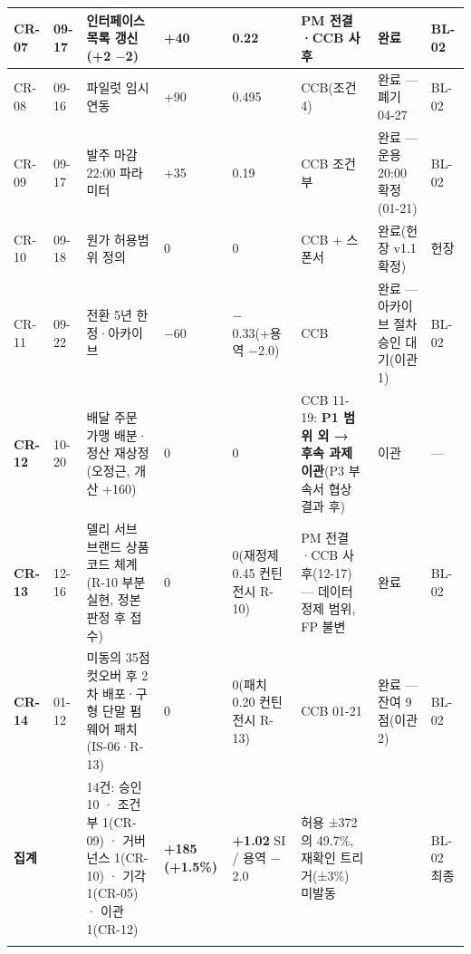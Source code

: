 \documentclass[10pt,a4paper]{article}
\begin{document}
{\begin{longtable}{|C{12mm}|L{13mm}|L{76mm}|C{13mm}|C{22mm}|L{52mm}|L{46mm}|L{16mm}|}
CR-07 & 09-17 & 인터페이스 목록 갱신(+2 $-$2) & +40 & 0.22 & PM 전결·CCB 사후 & 완료 & BL-02 \\ \hline
CR-08 & 09-16 & 파일럿 임시 연동 & +90 & 0.495 & CCB(조건 4) & 완료 — 폐기 04-27 & BL-02 \\ \hline
CR-09 & 09-17 & 발주 마감 22:00 파라미터 & +35 & 0.19 & CCB 조건부 & 완료 — 운용 20:00 확정(01-21) & BL-02 \\ \hline
CR-10 & 09-18 & 원가 허용범위 정의 & 0 & 0 & CCB + 스폰서 & 완료(헌장 v1.1 확정) & 헌장 \\ \hline
CR-11 & 09-22 & 전환 5년 한정·아카이브 & $-$60 & $-$0.33(+용역 $-$2.0) & CCB & 완료 — 아카이브 절차 승인 대기(이관 1) & BL-02 \\ \hline
\textbf{CR-12} & 10-20 & 배달 주문 가맹 배분·정산 재상정(오정근, 개산 +160) & 0 & 0 & CCB 11-19: \textbf{P1 범위 외 → 후속 과제 이관}(P3 부속서 협상 결과 후) & 이관 & — \\ \hline
\textbf{CR-13} & 12-16 & 델리 서브 브랜드 상품 코드 체계(R-10 부분 실현, 정본 판정 후 접수) & 0 & 0(재정제 0.45 컨틴전시 R-10) & PM 전결·CCB 사후(12-17) — 데이터 정제 범위, FP 불변 & 완료 & BL-02 \\ \hline
\textbf{CR-14} & 01-12 & 미동의 35점 컷오버 후 2차 배포·구형 단말 펌웨어 패치(IS-06·R-13) & 0 & 0(패치 0.20 컨틴전시 R-13) & CCB 01-21 & 완료 — 잔여 9점(이관 2) & BL-02 \\ \hline
\textbf{집계} & & 14건: 승인 10 · 조건부 1(CR-09) · 거버넌스 1(CR-10) · 기각 1(CR-05) · 이관 1(CR-12) & \textbf{+185 (+1.5\%)} & \textbf{+1.02} SI / 용역 $-$2.0 & 허용 ±372의 49.7\%, 재확인 트리거(±3\%) 미발동 & & BL-02 최종 \\ \hline
\fi
\end{longtable}}
\end{document}
